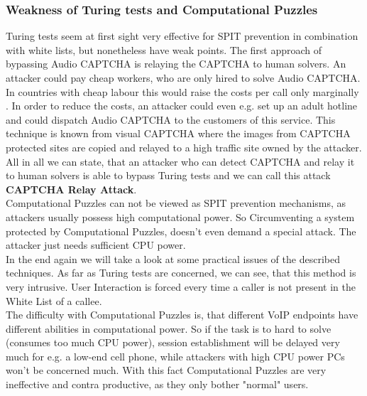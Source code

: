 \documentclass[final
	]{issa}
\begin{document}
\subsubsection{Weakness of Turing tests and Computational Puzzles}
Turing tests seem at first sight very effective for SPIT prevention in combination with white lists, but nonetheless have weak points. The first approach of bypassing Audio CAPTCHA is relaying the CAPTCHA to human solvers. An attacker could pay cheap workers, who are only hired to solve Audio CAPTCHA. In countries with cheap labour this would raise the costs per call only marginally \cite{rfc:5039}. In order to reduce the costs, an attacker could even e.g. set up an adult hotline and could dispatch Audio CAPTCHA to the customers of this service. This technique is known from visual CAPTCHA where the images from CAPTCHA protected sites are copied and relayed to a high traffic site owned by the attacker. All in all we can state, that an attacker who can detect CAPTCHA and relay it to human solvers is able to bypass Turing tests and we can call this attack \textbf{CAPTCHA Relay Attack}.\\
Computational Puzzles can not be viewed as SPIT prevention mechanisms, as attackers usually possess high computational power. So Circumventing a system protected by Computational Puzzles, doesn't even demand a special attack. The attacker just needs sufficient CPU power.\\
In the end again we will take a look at some practical issues of the described techniques. As far as Turing tests are concerned, we can see, that this method is very intrusive. User Interaction is forced every time a caller is not present in the White List of a callee.\\
The difficulty with Computational Puzzles is, that different VoIP endpoints have different abilities in computational power. So if the task is to hard to solve (consumes too much CPU power), session establishment will be delayed very much for e.g. a low-end cell phone, while attackers with high CPU power PCs won't be concerned much. With this fact Computational Puzzles are very ineffective and contra productive, as they only bother "normal" users.
\end{document}
